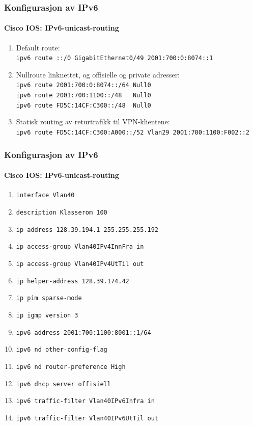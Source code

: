 \begin{frame}%
  \frametitle{Konfigurasjon av IPv6}
  \framesubtitle{Cisco IOS: IPv6-unicast-routing}
  \begin{enumerate}[<+->]
  \item Default route:\\
    \alert{\texttt{ipv6 route ::/0 GigabitEthernet0/49 2001:700:0:8074::1}}
  \item Nullroute linknettet, og offisielle og private adresser:\\
    \alert{\texttt{ipv6 route 2001:700:0:8074::/64 Null0}}\\
    \alert{\texttt{ipv6 route 2001:700:1100::/48\ \ \ Null0}}\\
    \alert{\texttt{ipv6 route FD5C:14CF:C300::/48\ \  Null0}}
  \item Statisk routing av returtrafikk til VPN-klientene:\\
    \alert{\texttt{ipv6 route FD5C:14CF:C300:A000::/52 Vlan29 2001:700:1100:F002::2}}
  \end{enumerate}
\end{frame}

\begin{frame}%
  \frametitle{Konfigurasjon av IPv6}
  \framesubtitle{Cisco IOS: IPv6-unicast-routing}
  \begin{enumerate}[<+->]
  \item \alert{\texttt{interface Vlan40}}
  \item \texttt{description Klasserom 100}
  \item \texttt{ip address 128.39.194.1 255.255.255.192}
  \item \texttt{ip access-group Vlan40IPv4InnFra in}
  \item \texttt{ip access-group Vlan40IPv4UtTil out}
  \item \texttt{ip helper-address 128.39.174.42}
  \item \texttt{ip pim sparse-mode}
  \item \texttt{ip igmp version 3}
  \item \alert{\texttt{ipv6 address 2001:700:1100:8001::1/64}}
  \item \alert{\texttt{ipv6 nd other-config-flag}}
  \item \alert{\texttt{ipv6 nd router-preference High}}
  \item \alert{\texttt{ipv6 dhcp server offisiell}}
  \item \alert{\texttt{ipv6 traffic-filter Vlan40IPv6Infra in}}
  \item \alert{\texttt{ipv6 traffic-filter Vlan40IPv6UtTil out}}
  \end{enumerate}
\end{frame}

